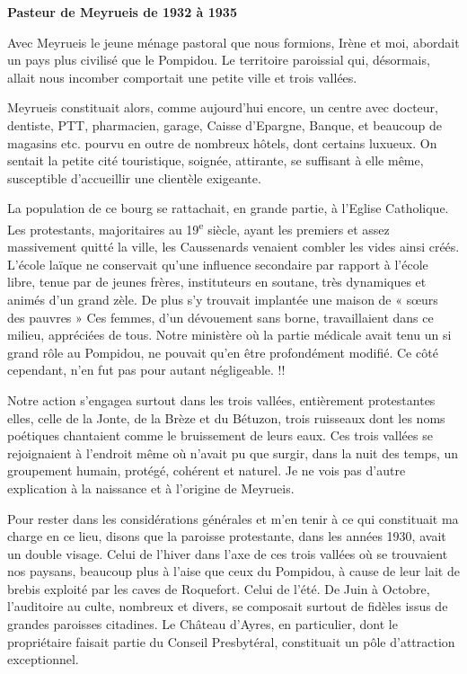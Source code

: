 

\begin{center}
\vspace{0.4em}
\textbf{Pasteur de Meyrueis de 1932 à 1935}
\end{center}

Avec Meyrueis le jeune ménage pastoral que nous formions, Irène et moi, abordait un
pays plus civilisé que le Pompidou. Le territoire paroissial qui, désormais, allait nous
incomber comportait une petite ville et trois vallées.

Meyrueis constituait alors, comme aujourd’hui encore, un centre avec docteur,
dentiste, PTT, pharmacien, garage, Caisse d’Epargne, Banque, et beaucoup de
magasins etc. pourvu en outre de nombreux hôtels, dont certains luxueux. On sentait
la petite cité touristique, soignée, attirante, se suffisant à elle même, susceptible
d’accueillir une clientèle exigeante.

La population de ce bourg se rattachait, en grande partie, à l’Eglise Catholique. Les
protestants, majoritaires au 19\textsuperscript{e} siècle, ayant les premiers et assez massivement quitté
la ville, les Caussenards venaient combler les vides ainsi créés. L’école laïque ne
conservait qu’une influence secondaire par rapport à l’école libre, tenue par de jeunes
frères, instituteurs en soutane, très dynamiques et animés d’un grand zèle. De plus s’y
trouvait implantée une maison de « sœurs des pauvres » Ces femmes, d’un
dévouement sans borne, travaillaient dans ce milieu, appréciées de tous.
Notre ministère où la partie médicale avait tenu un si grand rôle au Pompidou, ne
pouvait qu’en être profondément modifié. Ce côté cependant, n’en fut pas pour
autant négligeable. !!

Notre action s’engagea surtout dans les trois vallées, entièrement protestantes elles,
celle de la Jonte, de la Brèze et du Bétuzon, trois ruisseaux dont les noms poétiques
chantaient comme le bruissement de leurs eaux. Ces trois vallées se rejoignaient à
l’endroit même où n’avait pu que surgir, dans la nuit des temps, un groupement
humain, protégé, cohérent et naturel.
Je ne vois pas d’autre explication à la naissance et à l’origine de Meyrueis.

Pour rester dans les considérations générales et m’en tenir à ce qui constituait ma
charge en ce lieu, disons que la paroisse protestante, dans les années 1930, avait un
double visage. Celui de l’hiver dans l’axe de ces trois vallées où se trouvaient nos
paysans, beaucoup plus à l’aise que ceux du Pompidou, à cause de leur lait de brebis
exploité par les caves de Roquefort. Celui de l’été. De Juin à Octobre, l’auditoire au
culte, nombreux et divers, se composait surtout de fidèles issus de grandes paroisses
citadines. Le Château d’Ayres, en particulier, dont le propriétaire faisait partie du
Conseil Presbytéral, constituait un pôle d’attraction exceptionnel.

